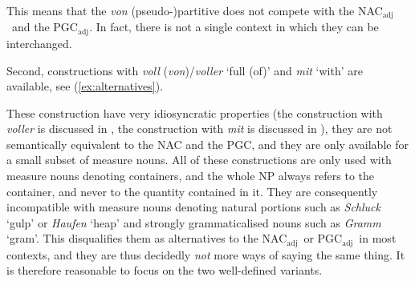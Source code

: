 \documentclass[USenglish]{article}
\newcommand{\Sub}[1]{\ensuremath{\mathrm{_{#1}}}}
\newcommand{\NACa}{NAC\Sub{adj}}
\newcommand{\PGCa}{PGC\Sub{adj}}
\begin{document}
\begin{exe}
  \ex\label{ex:analyticalpartitive} 
  \begin{xlist}
  \end{xlist}
\end{exe}

This means that the \textit{von} (pseudo-)partitive does not compete with the \NACa\ and the \PGCa.
In fact, there is not a single context in which they can be interchanged. 

Second, constructions with \textit{voll} (\textit{von})\slash\textit{voller} `full (of)' and \textit{mit} `with' are available, see (\ref{ex:alternatives}).

\begin{exe}
  \ex\label{ex:alternatives}
  \begin{xlist}
  \end{xlist}
\end{exe}

These construction have very idiosyncratic properties (the construction with \textit{voller} is discussed in \citealp{Zeldes2018}, the construction with \textit{mit} is discussed in \citealp{Bhatt1990}), they are not semantically equivalent to the NAC and the PGC, and they are only available for a small subset of measure nouns.
All of these constructions are only used with measure nouns denoting containers, and the whole NP always refers to the container, and never to the quantity contained in it.
They are consequently incompatible with measure nouns denoting natural portions such as \textit{Schluck} `gulp' or \textit{Haufen} `heap' and strongly grammaticalised nouns such as \textit{Gramm} `gram'.
This disqualifies them as alternatives to the \NACa\ or \PGCa\ in most contexts, and they are thus decidedly \textit{not} more ways of saying the same thing. 
It is therefore reasonable to focus on the two well-defined variants.
\end{document}
